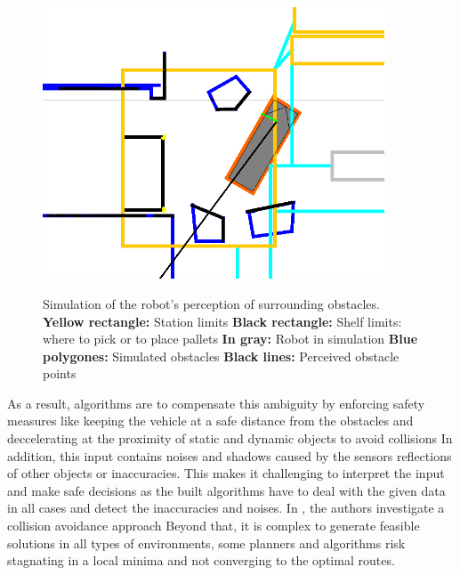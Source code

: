 \begin{figure}[H]
    \begin{center}
        \includegraphics[width=4in]{images/Chap1/scan.png}\\
        \caption{
        Simulation of the robot's perception of surrounding obstacles.
        \newline \textbf{Yellow rectangle:} Station limits
        \newline \textbf{Black rectangle:} Shelf limits: where to pick or to place pallets
        \newline \textbf{In gray:} Robot in simulation
        \newline \textbf{Blue polygones:} Simulated obstacles
        \newline \textbf{Black lines:} Perceived obstacle points}
        \label{scamSim}
        \end{center}
\end{figure}

As a result, algorithms are to compensate this ambiguity by enforcing safety measures like 
keeping the vehicle at a safe distance from the obstacles and deccelerating at the proximity 
of static and dynamic objects to avoid collisions
In addition, this input contains noises and shadows caused by the sensors reflections of other objects
or inaccuracies. 
This makes it challenging to interpret the input and make safe decisions as the built algorithms have to deal 
with the given data
in all cases and detect the inaccuracies and noises. In \cite{R22}, the authors investigate a collision 
avoidance approach 
Beyond that, it is complex to generate feasible solutions in all types of environments,
some planners and algorithms risk stagnating in a local minima and not converging to the optimal routes. 

